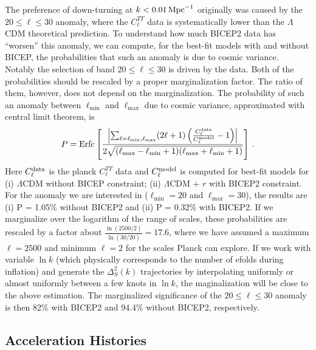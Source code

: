\documentclass[11pt]{article}
\begin{document}
The preference of down-turning at $k<0.01\,{\rm Mpc}^{-1}$ originally was caused by the $20\le \ell \le 30$ anomaly, where the $C_\ell^{TT}$ data is systematically lower than the $\Lambda$CDM theoretical prediction. To understand how much BICEP2 data has ``worsen'' this anomaly, we can compute, for the best-fit models with and without BICEP, the probabilities that such an anomaly is due to cosmic variance. Notably the selection of band $20\le \ell \le 30$ is driven by the data. Both of the probabilities should be rescaled by a proper marginalization factor. The ratio of them, however, does not depend on the marginalization. The probability of such an anomaly between $\ell_{\min}$ and $\ell_{\max}$ due to cosmic variance, approximated with central limit theorem, is
\begin{equation}
  P = {\rm Erfc}\left[\frac{\left\vert\sum_{\ell = \ell_{\min}, \ell_{\max}} (2\ell+1)\left( \frac{C_\ell^{\rm data}}{C_\ell^{\rm model}} - 1\right)\right\vert}{2\sqrt{(\ell_{\max}-\ell_{\min}+1)(\ell_{\max}+\ell_{\min}+1)}}\right] \, .
\end{equation}
Here $C_\ell^{\rm data}$ is the planck $C_\ell^{TT}$ data \cite{Planck2013PowerSpectra} and $C_\ell^{\rm model}$ is computed for best-fit models for (i) $\Lambda$CDM without BICEP constraint; (ii) $\Lambda$CDM + $r$ with BICEP2 constraint. For the anomaly we are interested in ($\ell_{\min} = 20$ and $\ell_{\max}=30$), the results are (i) P = 1.05\% without BICEP2 and (ii) P = 0.32\% with BICEP2. If we marginalize over the logarithm of the range of scales, these probabilities are rescaled by a factor about $\frac{\ln{(2500/2)}}{\ln{(30/20)}}=17.6$, where we have assumed a maximum $\ell = 2500$ and minimum $\ell = 2$ for the scales Planck can explore. If we work with variable $\ln k$ (which physically corresponds to the number of efolds during inflation) and generate the $\Delta^2_S(k)$ trajectories by interpolating uniformly or almost uniformly between a few knots in $\ln k$, the maginalization will be close to the above estimation. The marginalized significance of the $20\le \ell \le 30$ anomaly is then 82\% with BICEP2 and 94.4\% without BICEP2, respectively.

\subsection{Acceleration Histories}
\end{document}
